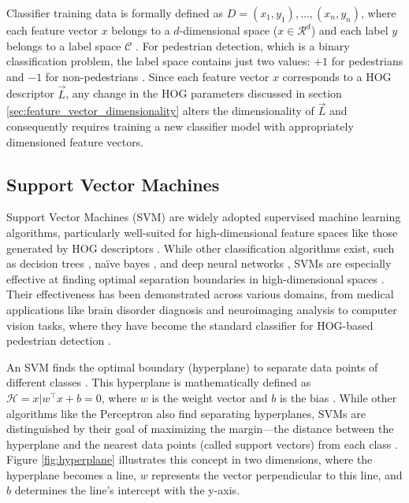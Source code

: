 Classifier training data is formally defined as $D={ (x_{1},y_{1}),\dots,(x_{n},y_{n}) }$, where each feature vector $x$ belongs to a $d$-dimensional space ($x\in \mathcal{R}^d$) and each label $y$ belongs to a label space $\mathcal{C}$ \cite{supervised_learning}. For pedestrian detection, which is a binary classification problem, the label space contains just two values: $+1$ for pedestrians and $-1$ for non-pedestrians \cite{cornell_svm}. Since each feature vector $x$ corresponds to a HOG descriptor $\vec{L}$, any change in the HOG parameters discussed in section \ref{sec:feature_vector_dimensionality} alters the dimensionality of $\vec{L}$ and consequently requires training a new classifier model with appropriately dimensioned feature vectors.

\subsection{Support Vector Machines}

Support Vector Machines (SVM) are widely adopted supervised machine learning algorithms, particularly well-suited for high-dimensional feature spaces like those generated by HOG descriptors \cite{ng_support}. While other classification algorithms exist, such as decision trees \cite{cornell_decision_trees}, naïve bayes \cite{cornell_naive_bayes}, and deep neural networks \cite{cornell_nn}, SVMs are especially effective at finding optimal separation boundaries in high-dimensional spaces \cite{chang_lin_2011_libsvm}. Their effectiveness has been demonstrated across various domains, from medical applications like brain disorder diagnosis \cite{derek_2020_svm} and neuroimaging analysis \cite{svm_mri} to computer vision tasks, where they have become the standard classifier for HOG-based pedestrian detection \cite{dalal_2005_histograms}.

An SVM finds the optimal boundary (hyperplane) to separate data points of different classes \cite{derek_2020_svm}. This hyperplane is mathematically defined as $\mathcal{H}={ x|w^\top x + b = 0 }$, where $w$ is the weight vector and $b$ is the bias \cite{cornell_svm_notes}. While other algorithms like the Perceptron \cite{cornell_perceptron} also find separating hyperplanes, SVMs are distinguished by their goal of maximizing the margin—the distance between the hyperplane and the nearest data points (called support vectors) from each class \cite{ng_support}. Figure \ref{fig:hyperplane} illustrates this concept in two dimensions, where the hyperplane becomes a line, $w$ represents the vector perpendicular to this line, and $b$ determines the line's intercept with the y-axis.

